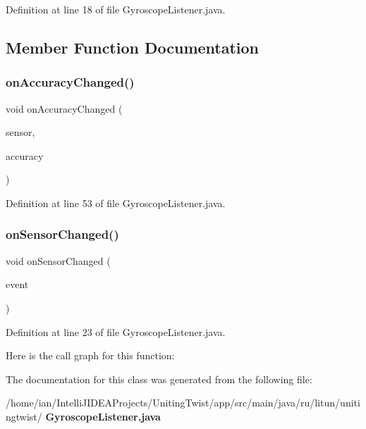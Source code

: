 Definition at line 18 of file Gyroscope\+Listener.\+java.



\subsection{Member Function Documentation}
\mbox{\label{classsf_1_1unitingtwist_1_1_gyroscope_listener_ad4112c2f627aebbbde6f254a743597d7}} 
\subsubsection{on\+Accuracy\+Changed()}
{\footnotesize\ttfamily void on\+Accuracy\+Changed (\begin{DoxyParamCaption}\item[{Sensor}]{sensor,  }\item[{int}]{accuracy }\end{DoxyParamCaption})}



Definition at line 53 of file Gyroscope\+Listener.\+java.

\mbox{\label{classsf_1_1unitingtwist_1_1_gyroscope_listener_af9fd31ff49a1d915a5c85cd04d87d30b}} 
\subsubsection{on\+Sensor\+Changed()}
{\footnotesize\ttfamily void on\+Sensor\+Changed (\begin{DoxyParamCaption}\item[{Sensor\+Event}]{event }\end{DoxyParamCaption})}



Definition at line 23 of file Gyroscope\+Listener.\+java.

Here is the call graph for this function\+:


The documentation for this class was generated from the following file\+:\begin{DoxyCompactItemize}
\item 
/home/ian/\+Intelli\+J\+I\+D\+E\+A\+Projects/\+Uniting\+Twist/app/src/main/java/ru/litun/unitingtwist/\textbf{ Gyroscope\+Listener.\+java}\end{DoxyCompactItemize}
